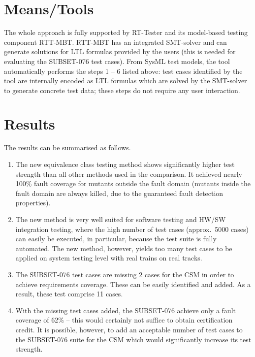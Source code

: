 \section{Means/Tools}

The whole approach is fully supported by RT-Tester and its model-based testing component RTT-MBT. RTT-MBT has an integrated SMT-solver and can generate solutions for LTL formulas provided by the users (this is needed for evaluating the SUBSET-076 test cases). From 
SysML test models, the tool automatically performs the steps 1 -- 6 listed above:
test cases identified by the tool are internally encoded as LTL formulas which are solved by the SMT-solver to generate concrete test data; these steps do not 
require any user interaction.

\section{Results}
The results can be summarised as follows.
\begin{enumerate}
\item The new equivalence class testing method shows significantly higher test strength than all other methods used in the comparison. It achieved nearly 100\% fault coverage for mutants outside the fault domain (mutants inside the fault domain are always killed, due to the guaranteed  fault detection properties).  

\item The new method is very well suited for software testing and HW/SW integration testing, where the high number of test cases (approx.~5000 cases) can easily be executed, in particular, because the test suite is fully automated. The new method, however,
 yields too many 
test cases to be applied on system testing level with real  trains on real tracks.


\item The SUBSET-076 test cases are missing 2 cases for the CSM in order to achieve
requirements coverage. These can be easily identified and added. As a result,
these test comprise 11 cases.

\item With the missing test cases added, the SUBSET-076 achieve only a fault coverage of
62\% -- this would certainly not suffice to obtain certification credit. It is
possible, however, to add an acceptable number of test cases to the SUBSET-076
suite for the CSM which would significantly increase its test strength.


\end{enumerate}


